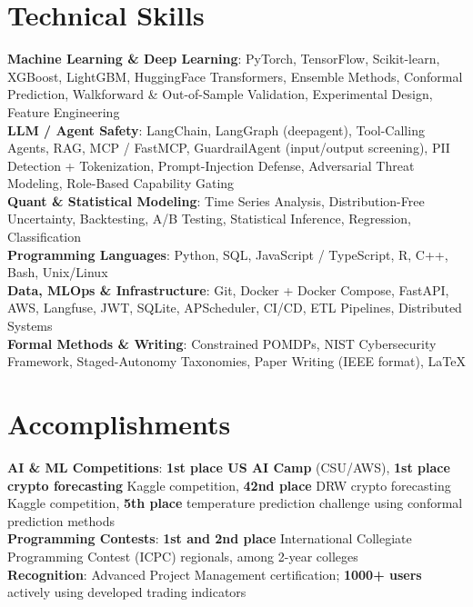 \documentclass[letterpaper,11pt]{article}
\begin{document}
\section{Technical Skills}
 \begin{itemize}[leftmargin=0.15in, label={}]
    \small{\item{
     \textbf{Machine Learning \& Deep Learning}{: PyTorch, TensorFlow, Scikit-learn, XGBoost, LightGBM, HuggingFace Transformers, Ensemble Methods, Conformal Prediction, Walkforward \& Out-of-Sample Validation, Experimental Design, Feature Engineering} \\
     \textbf{LLM / Agent Safety}{: LangChain, LangGraph (deepagent), Tool-Calling Agents, RAG, MCP / FastMCP, GuardrailAgent (input/output screening), PII Detection + Tokenization, Prompt-Injection Defense, Adversarial Threat Modeling, Role-Based Capability Gating} \\
     \textbf{Quant \& Statistical Modeling}{: Time Series Analysis, Distribution-Free Uncertainty, Backtesting, A/B Testing, Statistical Inference, Regression, Classification} \\
     \textbf{Programming Languages}{: Python, SQL, JavaScript / TypeScript, R, C++, Bash, Unix/Linux} \\
     \textbf{Data, MLOps \& Infrastructure}{: Git, Docker + Docker Compose, FastAPI, AWS, Langfuse, JWT, SQLite, APScheduler, CI/CD, ETL Pipelines, Distributed Systems} \\
     \textbf{Formal Methods \& Writing}{: Constrained POMDPs, NIST Cybersecurity Framework, Staged-Autonomy Taxonomies, Paper Writing (IEEE format), \LaTeX}
    }}
 \end{itemize}


\section{Accomplishments}
 \begin{itemize}[leftmargin=0.15in, label={}]
    \small{\item{
     \textbf{AI \& ML Competitions}{: \textbf{1st place US AI Camp} (CSU/AWS), \textbf{1st place crypto forecasting} Kaggle competition, \textbf{42nd place} DRW crypto forecasting Kaggle competition, \textbf{5th place} temperature prediction challenge using conformal prediction methods} \\
     \textbf{Programming Contests}{: \textbf{1st and 2nd place} International Collegiate Programming Contest (ICPC) regionals, among 2-year colleges} \\
     \textbf{Recognition}{: Advanced Project Management certification; \textbf{1000+ users} actively using developed trading indicators}
    }}
 \end{itemize}
\end{document}
